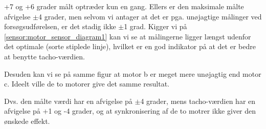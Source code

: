 +7 og +6 grader målt optræder kun en gang.
Ellers er den maksimale målte afvigelse $\pm$4 grader, men selvom vi antager at det er pga. unøjagtige målinger ved forsøgsudførelsen, er det stadig ikke $\pm$1 grad.
Kigger vi på \cref{sensor:motor_sensor_diagram1} kan vi se at målingerne ligger længst udenfor det optimale (sorte stiplede linje), hvilket er en god indikator på at det er bedre at benytte tacho-værdien.

Desuden kan vi se på samme figur at motor b er meget mere unøjagtig end motor c.
Ideelt ville de to motorer give det samme resultat.

Dvs. den målte værdi har en afvigelse på $\pm$4 grader, mens tacho-værdien har en afvigelse på +1 og -4 grader, og at synkronisering af de to motrer ikke giver den ønskede effekt.
